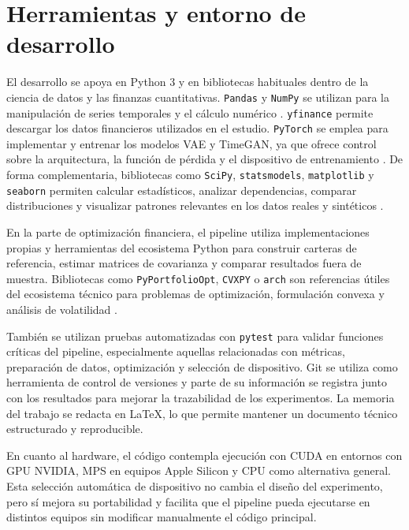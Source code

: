 \documentclass[11pt,a4paper,spanish,oneside]{book}
\numberwithin{equation}{chapter}
\numberwithin{figure}{chapter}
\begin{document}
\section{Herramientas y entorno de desarrollo}

El desarrollo se apoya en Python 3 y en bibliotecas habituales dentro de la ciencia de datos y las finanzas cuantitativas. \texttt{Pandas} y \texttt{NumPy} se utilizan para la manipulación de series temporales y el cálculo numérico \cite{Harris2020,McKinney2010}. \texttt{yfinance} permite descargar los datos financieros utilizados en el estudio. \texttt{PyTorch} se emplea para implementar y entrenar los modelos VAE y TimeGAN, ya que ofrece control sobre la arquitectura, la función de pérdida y el dispositivo de entrenamiento \cite{Paszke2019}. De forma complementaria, bibliotecas como \texttt{SciPy}, \texttt{statsmodels}, \texttt{matplotlib} y \texttt{seaborn} permiten calcular estadísticos, analizar dependencias, comparar distribuciones y visualizar patrones relevantes en los datos reales y sintéticos \cite{Virtanen2020,Seabold2010}.

En la parte de optimización financiera, el pipeline utiliza implementaciones propias y herramientas del ecosistema Python para construir carteras de referencia, estimar matrices de covarianza y comparar resultados fuera de muestra. Bibliotecas como \texttt{PyPortfolioOpt}, \texttt{CVXPY} o \texttt{arch} son referencias útiles del ecosistema técnico para problemas de optimización, formulación convexa y análisis de volatilidad \cite{Martin2021,Diamond2016,Sheppard2024}.

También se utilizan pruebas automatizadas con \texttt{pytest} para validar funciones críticas del pipeline, especialmente aquellas relacionadas con métricas, preparación de datos, optimización y selección de dispositivo. Git se utiliza como herramienta de control de versiones y parte de su información se registra junto con los resultados para mejorar la trazabilidad de los experimentos. La memoria del trabajo se redacta en LaTeX, lo que permite mantener un documento técnico estructurado y reproducible.

En cuanto al hardware, el código contempla ejecución con CUDA en entornos con GPU NVIDIA, MPS en equipos Apple Silicon y CPU como alternativa general. Esta selección automática de dispositivo no cambia el diseño del experimento, pero sí mejora su portabilidad y facilita que el pipeline pueda ejecutarse en distintos equipos sin modificar manualmente el código principal.
\end{document}
